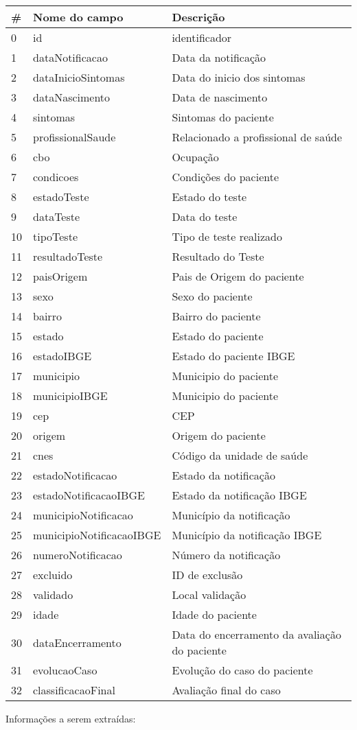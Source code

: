 \documentclass[11pt]{article}
\begin{document}
\begin{longtable}[]{@{}lll@{}}
\toprule
\# & Nome do campo & Descrição\tabularnewline
\midrule
\endhead
0 & id & identificador\tabularnewline
1 & dataNotificacao & Data da notificação\tabularnewline
2 & dataInicioSintomas & Data do inicio dos sintomas\tabularnewline
3 & dataNascimento & Data de nascimento\tabularnewline
4 & sintomas & Sintomas do paciente\tabularnewline
5 & profissionalSaude & Relacionado a profissional de
saúde\tabularnewline
6 & cbo & Ocupação\tabularnewline
7 & condicoes & Condições do paciente\tabularnewline
8 & estadoTeste & Estado do teste\tabularnewline
9 & dataTeste & Data do teste\tabularnewline
10 & tipoTeste & Tipo de teste realizado\tabularnewline
11 & resultadoTeste & Resultado do Teste\tabularnewline
12 & paisOrigem & Pais de Origem do paciente\tabularnewline
13 & sexo & Sexo do paciente\tabularnewline
14 & bairro & Bairro do paciente\tabularnewline
15 & estado & Estado do paciente\tabularnewline
16 & estadoIBGE & Estado do paciente IBGE\tabularnewline
17 & municipio & Municipio do paciente\tabularnewline
18 & municipioIBGE & Municipio do paciente\tabularnewline
19 & cep & CEP\tabularnewline
20 & origem & Origem do paciente\tabularnewline
21 & cnes & Código da unidade de saúde\tabularnewline
22 & estadoNotificacao & Estado da notificação\tabularnewline
23 & estadoNotificacaoIBGE & Estado da notificação IBGE\tabularnewline
24 & municipioNotificacao & Município da notificação\tabularnewline
25 & municipioNotificacaoIBGE & Município da notificação
IBGE\tabularnewline
26 & numeroNotificacao & Número da notificação\tabularnewline
27 & excluido & ID de exclusão\tabularnewline
28 & validado & Local validação\tabularnewline
29 & idade & Idade do paciente\tabularnewline
30 & dataEncerramento & Data do encerramento da avaliação do
paciente\tabularnewline
31 & evolucaoCaso & Evolução do caso do paciente\tabularnewline
32 & classificacaoFinal & Avaliação final do caso\tabularnewline
\bottomrule
\end{longtable}

Informações a serem extraídas:
\end{document}
